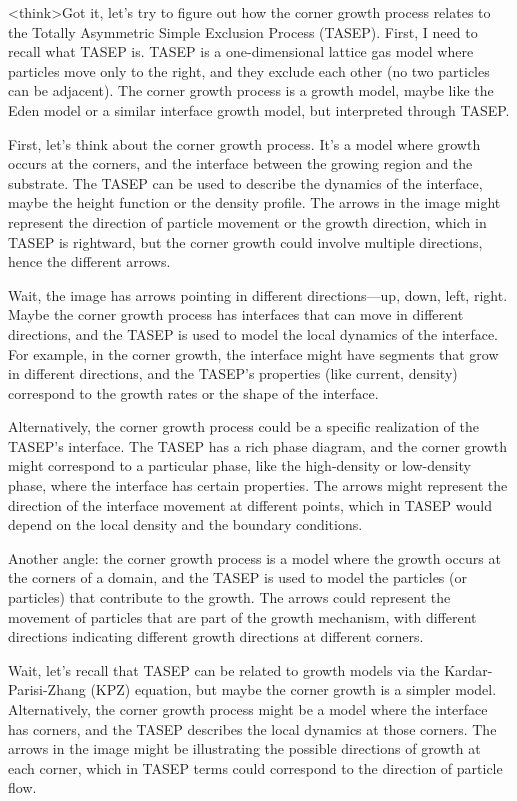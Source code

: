 <think>Got it, let's try to figure out how the corner growth process relates to the Totally Asymmetric Simple Exclusion Process (TASEP). First, I need to recall what TASEP is. TASEP is a one-dimensional lattice gas model where particles move only to the right, and they exclude each other (no two particles can be adjacent). The corner growth process is a growth model, maybe like the Eden model or a similar interface growth model, but interpreted through TASEP.

First, let's think about the corner growth process. It's a model where growth occurs at the corners, and the interface between the growing region and the substrate. The TASEP can be used to describe the dynamics of the interface, maybe the height function or the density profile. The arrows in the image might represent the direction of particle movement or the growth direction, which in TASEP is rightward, but the corner growth could involve multiple directions, hence the different arrows.

Wait, the image has arrows pointing in different directions—up, down, left, right. Maybe the corner growth process has interfaces that can move in different directions, and the TASEP is used to model the local dynamics of the interface. For example, in the corner growth, the interface might have segments that grow in different directions, and the TASEP's properties (like current, density) correspond to the growth rates or the shape of the interface.

Alternatively, the corner growth process could be a specific realization of the TASEP's interface. The TASEP has a rich phase diagram, and the corner growth might correspond to a particular phase, like the high-density or low-density phase, where the interface has certain properties. The arrows might represent the direction of the interface movement at different points, which in TASEP would depend on the local density and the boundary conditions.

Another angle: the corner growth process is a model where the growth occurs at the corners of a domain, and the TASEP is used to model the particles (or particles) that contribute to the growth. The arrows could represent the movement of particles that are part of the growth mechanism, with different directions indicating different growth directions at different corners.

Wait, let's recall that TASEP can be related to growth models via the Kardar-Parisi-Zhang (KPZ) equation, but maybe the corner growth is a simpler model. Alternatively, the corner growth process might be a model where the interface has corners, and the TASEP describes the local dynamics at those corners. The arrows in the image might be illustrating the possible directions of growth at each corner, which in TASEP terms could correspond to the direction of particle flow.

